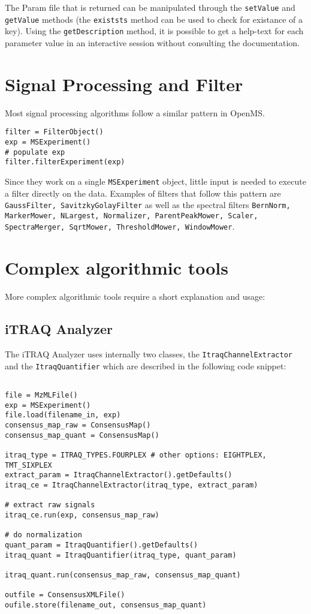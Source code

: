 \documentclass[10pt]{article}
\begin{document}
The Param file that is returned can be manipulated through the \texttt{setValue} and
\texttt{getValue} methods (the \texttt{existsts} method can be used to check for existance of a
key). Using the \texttt{getDescription} method, it is possible to get a help-text for
each parameter value in an interactive session without consulting the documentation.

\section{Signal Processing and Filter}
Most signal processing algorithms follow a similar pattern in OpenMS.  

\begin{verbatim}
filter = FilterObject()
exp = MSExperiment() 
# populate exp
filter.filterExperiment(exp)
\end{verbatim}

Since they work on a single \texttt{MSExperiment} object, little input is needed to
execute a filter directly on the data. Examples of filters that follow this
pattern are \texttt{GaussFilter, SavitzkyGolayFilter} as well as the spectral
filters \texttt{BernNorm, MarkerMower, NLargest, Normalizer, ParentPeakMower,
Scaler, SpectraMerger, SqrtMower, ThresholdMower, WindowMower}.

\section{Complex algorithmic tools}

More complex algorithmic tools require a short explanation and usage:

\subsection{iTRAQ Analyzer}

The iTRAQ Analyzer uses internally two classes, the
\texttt{ItraqChannelExtractor} and the \texttt{ItraqQuantifier} which are
described in the following code snippet:

\begin{verbatim}

file = MzMLFile() 
exp = MSExperiment() 
file.load(filename_in, exp)
consensus_map_raw = ConsensusMap()  
consensus_map_quant = ConsensusMap() 

itraq_type = ITRAQ_TYPES.FOURPLEX # other options: EIGHTPLEX, TMT_SIXPLEX
extract_param = ItraqChannelExtractor().getDefaults()
itraq_ce = ItraqChannelExtractor(itraq_type, extract_param)

# extract raw signals
itraq_ce.run(exp, consensus_map_raw)

# do normalization
quant_param = ItraqQuantifier().getDefaults()
itraq_quant = ItraqQuantifier(itraq_type, quant_param)

itraq_quant.run(consensus_map_raw, consensus_map_quant)

outfile = ConsensusXMLFile()
oufile.store(filename_out, consensus_map_quant)
\end{verbatim}
\end{document}

